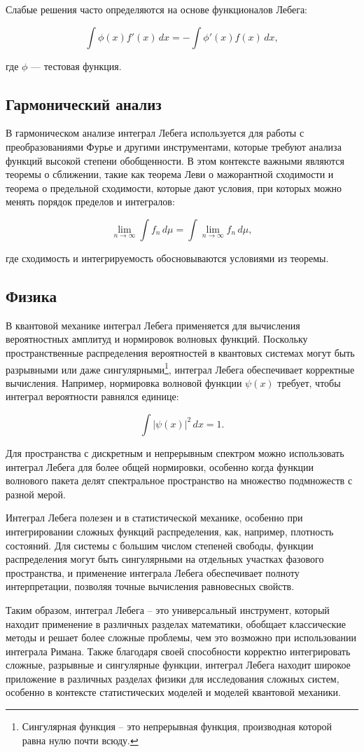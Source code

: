 \documentclass[a4paper,14pt]{extarticle}
\newcommand{\nosubsection}[1]{%
  \refstepcounter{subsection}%
  \subsection*{\thesubsection\hspace{1em}#1}%
}
\begin{document}
Слабые решения часто определяются на основе функционалов Лебега:

$$
\int \phi(x) f'(x) \, dx = -\int \phi'(x) f(x) \, dx,
$$

\noindent где $\phi$ — тестовая функция.

\nosubsection{Гармонический анализ}

В гармоническом анализе интеграл Лебега используется для работы с преобразованиями Фурье и другими инструментами, которые требуют анализа функций высокой степени обобщенности. В этом контексте важными являются теоремы о сближении, такие как теорема Леви о мажорантной сходимости и теорема о предельной сходимости, которые дают условия, при которых можно менять порядок пределов и интегралов:

$$
\lim_{n \to \infty} \int f_n \, d\mu = \int \lim_{n \to \infty} f_n \, d\mu,
$$

\noindent где сходимость и интегрируемость обосновываются условиями из теоремы.

\nosubsection{Физика}

В квантовой механике интеграл Лебега применяется для вычисления вероятностных амплитуд и нормировок волновых функций. Поскольку пространственные распределения вероятностей в квантовых системах могут быть разрывными или даже сингулярными\footnote{Сингулярная функция -- это непрерывная функция, производная которой равна нулю почти всюду.}, интеграл Лебега обеспечивает корректные вычисления. Например, нормировка волновой функции $\psi(x)$ требует, чтобы интеграл вероятности равнялся единице:

$$
\int |\psi(x)|^2 \, dx = 1.
$$

Для пространства с дискретным и непрерывным спектром можно использовать интеграл Лебега для более общей нормировки, особенно когда функции волнового пакета делят спектральное пространство на множество подмножеств с разной мерой.

Интеграл Лебега полезен и в статистической механике, особенно при интегрировании сложных функций распределения, как, например, плотность состояний. Для системы с большим числом степеней свободы, функции распределения могут быть сингулярными на отдельных участках фазового пространства, и применение интеграла Лебега обеспечивает полноту интерпретации, позволяя точные вычисления равновесных свойств.

Таким образом, интеграл Лебега -- это универсальный инструмент, который находит применение в различных разделах математики, обобщает классические методы и решает более сложные проблемы, чем это возможно при использовании интеграла Римана. Также благодаря своей способности корректно интегрировать сложные, разрывные и сингулярные функции, интеграл Лебега находит широкое приложение в различных разделах физики для исследования сложных систем, особенно в контексте статистических моделей и моделей квантовой механики.
\end{document}
